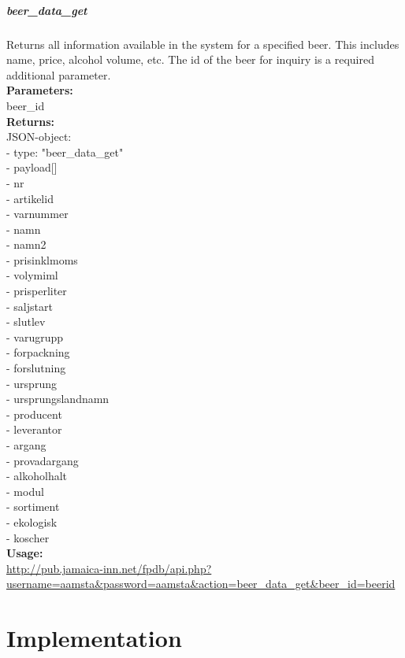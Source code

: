\documentclass{article}
\begin{document}
\subsubsection{beer\_data\_get}
Returns all information available in the system for a specified beer. This includes name, price, alcohol volume, etc. The id of the beer for inquiry is a required additional parameter.\\
\textbf{Parameters:}\\
beer\_id\\
\textbf{Returns:}\\
JSON-object:\\
- type: "beer\_data\_get"\\
- payload[]\\
\indent - nr\\
\indent - artikelid\\
\indent - varnummer\\
\indent - namn\\
\indent - namn2\\
\indent - prisinklmoms\\
\indent - volymiml\\
\indent - prisperliter\\
\indent - saljstart\\
\indent - slutlev\\
\indent - varugrupp\\
\indent - forpackning\\
\indent - forslutning\\
\indent - ursprung\\
\indent - ursprungslandnamn\\
\indent - producent\\
\indent - leverantor\\
\indent - argang\\
\indent - provadargang\\
\indent - alkoholhalt\\
\indent - modul\\
\indent - sortiment\\
\indent - ekologisk\\
\indent - koscher\\
\textbf{Usage:}\\
\url{http://pub.jamaica-inn.net/fpdb/api.php?username=aamsta\&password=aamsta\&action=beer\_data\_get\&beer\_id=beerid}\\



\part{Implementation}
\end{document}
